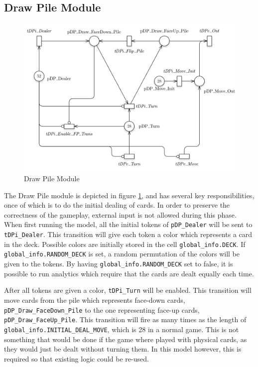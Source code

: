 \documentclass[runningheads,a4paper]{llncs}
\begin{document}
\subsection{Draw Pile Module}
\label{sec:draw_pile}
\begin{figure}
	\begin{center}
		\includegraphics[width=\textwidth]{images/drawPile}
		\caption{Draw Pile Module}
		\label{fig:draw_pile}
	\end{center}
\end{figure}
The Draw Pile module is depicted in figure \ref{fig:draw_pile}, and has several key responsibilities, once of which is to do the initial dealing of cards. In order to preserve the correctness of the gameplay, external input is not allowed during this phase. When first running the model, all the initial tokens of \verb!pDP_Dealer! will be sent to \verb!tDPi_Dealer!. This transition will give each token a color which represents a \ac{card} in the deck. Possible colors are initially stored in the cell \verb!global_info.DECK!. If \verb!global_info.RANDOM_DECK! is set, a random permutation of the colors will be given to the tokens. By having \verb!global_info.RANDOM_DECK! set to false, it is possible to run analytics which require that the cards are dealt equally each time.
\newline

After all tokens are given a color, \verb!tDPi_Turn! will be enabled. This transition will move cards from the pile which represents face-down cards, \verb!pDP_Draw_FaceDown_Pile! to the one representing face-up cards, \verb!pDP_Draw_FaceUp_Pile!. This transition will fire as many times as the length of \verb!global_info.INITIAL_DEAL_MOVE!, which is 28 in a normal game. This is not something that would be done if the game where played with physical cards, as they would just be dealt without turning them. In this model however, this is required so that existing logic could be re-used.
\newline
\end{document}
